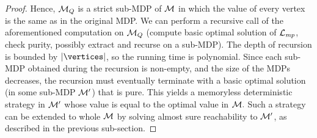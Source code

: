\begin{proof}
Hence, $\mathcal{M}_Q$ is a strict sub-MDP of $\mathcal{M}$ in which the value of every vertex is the same as in the original MDP. We can perform a recursive call of the aforementioned computation on $\mathcal{M}_Q$ (compute basic optimal solution of $\mathcal{L}_{\mathit{mp}}$, check purity, possibly extract and recurse on a sub-MDP).
The depth of recursion is bounded by $|\vertices|$, so the running time is polynomial. Since each sub-MDP obtained during the recursion is non-empty, and the size of the MDPs decreases, the recursion must eventually terminate with a basic optimal solution (in some sub-MDP $\mathcal{M}'$) that is pure. This yields a memoryless deterministic strategy in $\mathcal{M}'$ whose value is equal to the optimal value in $\mathcal{M}.$ Such a strategy can be extended to whole $\mathcal{M}$ by solving almost sure reachability to $ \mathcal{M}' $, as described in the previous sub-section.
%
%
%
%   
\end{proof}






	
	






